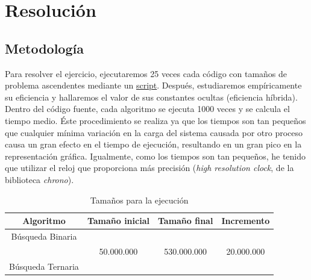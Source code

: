 \documentclass[12pt,spanish]{article}
\begin{document}
\section{Resolución}

\subsection{Metodología}
Para resolver el ejercicio, ejecutaremos 25 veces cada código con tamaños de problema ascendentes mediante un \textcolor{blue!50}{\hyperref[script]{script}}.
Después, estudiaremos empíricamente su eficiencia y hallaremos el valor de sus constantes ocultas (eficiencia híbrida). Dentro del código fuente, cada algoritmo se ejecuta 1000 veces y se calcula el tiempo medio. Éste procedimiento se realiza ya que los tiempos son tan pequeños que cualquier mínima variación en la carga del sistema causada por otro proceso causa un gran efecto en el tiempo de ejecución, resultando en un gran pico en la representación gráfica. Igualmente, como los tiempos son tan pequeños, he tenido que utilizar el reloj que proporciona más precisión (\emph{high resolution clock}, de la biblioteca \textit{chrono}).

\begin{table}[H]
\centering
\begin{tabular}{|c|c|c|c|}
\hline
\textbf{Algoritmo} & \textbf{Tamaño inicial} & \textbf{Tamaño final} & \textbf{Incremento}\\
\hline
Búsqueda Binaria & & &\\
& 50.000.000  & 530.000.000 & 20.000.000\\
Búsqueda Ternaria & & &\\
\hline
\end{tabular}
\caption{Tamaños para la ejecución}
\end{table}
\end{document}
